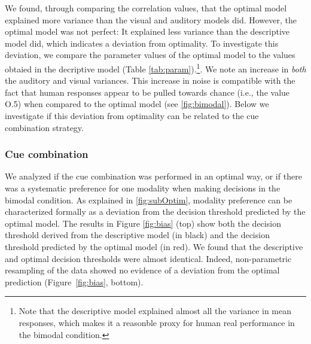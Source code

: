 \documentclass[english,,man,floatsintext]{apa6}
\let\rmarkdownfootnote\footnote%
\def\footnote{\protect\rmarkdownfootnote}
\theoremstyle{definition}
\theoremstyle{definition}
\theoremstyle{definition}
\theoremstyle{remark}
\begin{document}
We found, through comparing the correlation values, that the optimal
model explained more variance than the visual and auditory models did.
However, the optimal model was not perfect: It explained less variance
than the descriptive model did, which indicates a deviation from
optimality. To investigate this deviation, we compare the parameter
values of the optimal model to the values obtaied in the decriptive
model (Table
\ref{tab:param}).\footnote{Note that the descriptive model explained almost all the variance in mean responses, which makes it a reasonble proxy for human real performance in the bimodal condition.}.
We note an increase in \emph{both} the auditory and visual variances.
This increase in noise is compatible with the fact that human responses
appear to be pulled towards chance (i.e., the value O.5) when compared
to the optimal model (see \ref{fig:bimodal}). Below we investigate if
this deviation from optimality can be related to the cue combination
strategy.

\subsubsection{Cue combination}\label{cue-combination}

We analyzed if the cue combination was performed in an optimal way, or
if there was a systematic preference for one modality when making
decisions in the bimodal condition. As explained in \ref{fig:subOptim},
modality preference can be characterized formally as a deviation from
the decision threshold predicted by the optimal model. The results in
Figure \ref{fig:bias} (top) show both the decision threshold derived
from the descriptive model (in black) and the decision threshold
predicted by the optimal model (in red). We found that the descriptive
and optimal decision thresholds were almost identical. Indeed,
non-parametric resampling of the data showed no evidence of a deviation
from the optimal prediction (Figure~\ref{fig:bias}, bottom).
\end{document}
